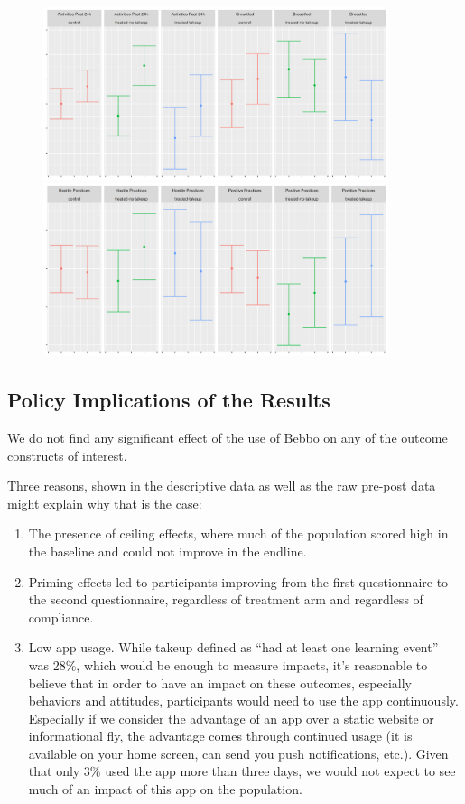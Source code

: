 \documentclass{article}
\begin{document}
\begin{figure}[H]
  \centering
\includegraphics[width=0.9\textwidth]{plots/pre_post/Pooled: Breastfed.png}
\includegraphics[width=0.9\textwidth]{plots/pre_post/Pooled: Positive Practices.png}

\end{figure}

\subsection*{Policy Implications of the Results}

We do not find any significant effect of the use of Bebbo on any of the outcome constructs of interest.

Three reasons, shown in the descriptive data as well as the raw pre-post data might explain why that is the case:
\begin{enumerate}
\item The presence of ceiling effects, where much of the population scored high in the baseline and could not improve in the endline.
\item Priming effects led to participants improving from the first questionnaire to the second questionnaire, regardless of treatment arm and regardless of compliance.
\item Low app usage. While takeup defined as ``had at least one learning event'' was 28\%, which would be enough to measure impacts, it's reasonable to believe that in order to have an impact on these outcomes, especially behaviors and attitudes, participants would need to use the app continuously. Especially if we consider the advantage of an app over a static website or informational fly, the advantage comes through continued usage (it is available on your home screen, can send you push notifications, etc.). Given that only 3\% used the app more than three days, we would not expect to see much of an impact of this app on the population.
\end{enumerate}
\end{document}
